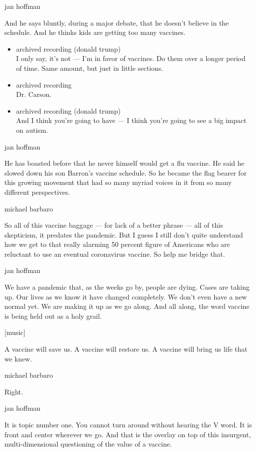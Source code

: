 jan hoffman

And he says bluntly, during a major debate, that he doesn't believe in
the schedule. And he thinks kids are getting too many vaccines.

\begin{itemize}
\item
  archived recording (donald trump)\\
  I only say, it's not --- I'm in favor of vaccines. Do them over a
  longer period of time. Same amount, but just in little sections.
\item
  archived recording\\
  Dr. Carson.
\item
  archived recording (donald trump)\\
  And I think you're going to have --- I think you're going to see a big
  impact on autism.
\end{itemize}

jan hoffman

He has boasted before that he never himself would get a flu vaccine. He
said he slowed down his son Barron's vaccine schedule. So he became the
flag bearer for this growing movement that had so many myriad voices in
it from so many different perspectives.

michael barbaro

So all of this vaccine baggage --- for lack of a better phrase --- all
of this skepticism, it predates the pandemic. But I guess I still don't
quite understand how we get to that really alarming 50 percent figure of
Americans who are reluctant to use an eventual coronavirus vaccine. So
help me bridge that.

jan hoffman

We have a pandemic that, as the weeks go by, people are dying. Cases are
taking up. Our lives as we know it have changed completely. We don't
even have a new normal yet. We are making it up as we go along. And all
along, the word vaccine is being held out as a holy grail.

{[}music{]}

A vaccine will save us. A vaccine will restore us. A vaccine will bring
us life that we knew.

michael barbaro

Right.

jan hoffman

It is topic number one. You cannot turn around without hearing the V
word. It is front and center wherever we go. And that is the overlay on
top of this insurgent, multi-dimensional questioning of the value of a
vaccine.

